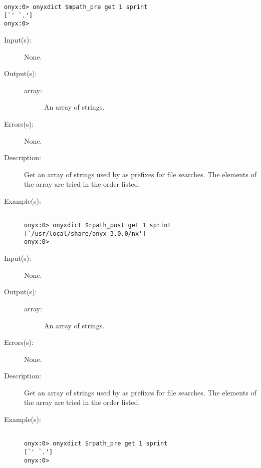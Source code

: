 \begin{description}
\begin{description}
\begin{verbatim}
onyx:0> onyxdict $mpath_pre get 1 sprint
[`' `.']
onyx:0>
		\end{verbatim}
	\end{description}
\label{onyxdict:rpath_post}
\item[{\onyxop{--}{rpath\_post}{array}}: ]
	\begin{description}\item[]
	\item[Input(s): ] None.
	\item[Output(s): ]
		\begin{description}\item[]
		\item[array: ]
			An array of strings.
		\end{description}
	\item[Errors(s): ] None.
	\item[Description: ]
		Get an array of strings used by
		 as prefixes for file
		searches.  The elements of the array are tried in the order
		listed.
	\item[Example(s): ]\begin{verbatim}

onyx:0> onyxdict $rpath_post get 1 sprint
[`/usr/local/share/onyx-3.0.0/nx']
onyx:0>
		\end{verbatim}
	\end{description}
\label{onyxdict:rpath_pre}
\item[{\onyxop{--}{rpath\_pre}{array}}: ]
	\begin{description}\item[]
	\item[Input(s): ] None.
	\item[Output(s): ]
		\begin{description}\item[]
		\item[array: ]
			An array of strings.
		\end{description}
	\item[Errors(s): ] None.
	\item[Description: ]
		Get an array of strings used by
		 as prefixes for file
		searches.  The elements of the array are tried in the order
		listed.
	\item[Example(s): ]\begin{verbatim}

onyx:0> onyxdict $rpath_pre get 1 sprint
[`' `.']
onyx:0>
		\end{verbatim}
	\end{description}
\end{description}

